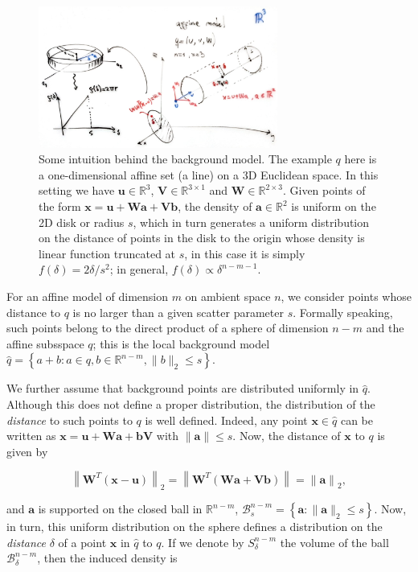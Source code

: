\documentclass[a4page,11pt]{article}
\renewcommand{\vec}[1]{\mathbf{#1}}%
\newcommand{\mat}[1]{\mathbf{#1}}%
\newcommand{\set}[1]{\mathcal{#1}}%
\newcommand{\setdef}[1]{\left\{#1\right\}}%
\newcommand{\norm}[1]{\left\|#1\right\|}%
\def\tra{^T}%
\def\reals{\mathbb{R}}%
\begin{document}
\begin{figure}
\centering\includegraphics[width=0.7\textwidth]{intuition}
\caption{\label{fig:intuition}Some intuition behind the background model. The example $q$ here is a one-dimensional affine set (a line) on a 3D Euclidean space. In this setting we have $\vec{u} \in \reals^{3}$, $\mat{V} \in \reals^{3{\times}1}$ and $\mat{W} \in \reals^{2{\times}3}$. Given points of the form $\vec{x}=\vec{u}+\vec{W}\vec{a}+\vec{V}\vec{b}$, the density of $\vec{a} \in \reals^2$ is uniform on the 2D disk or radius $s$, which in turn generates a uniform distribution on the distance of points in the disk to the origin whose  density is linear function truncated at $s$, in this case it is simply $f(\delta)=2\delta/s^2$; in general, $f(\delta) \propto \delta^{n-m-1}$.}
\end{figure}


For an affine model of dimension $m$ on ambient space $n$, we consider points whose distance to $q$ is no larger than a given scatter parameter $s$. Formally speaking, such points belong to  the direct product of a sphere of dimension $n-m$ and the affine subsspace $q$; this is the local background model $\hat{q} = \setdef{a+b: a \in q, b \in \reals^{n-m}, \|b\|_2 \leq s}$. 

We further assume that background points are distributed uniformly in $\hat{q}$. Although this does not define a proper distribution, the distribution of the \emph{distance} to such points to $q$ is well defined. Indeed, any point  $\vec{x} \in \hat{q}$ can be written as $\vec{x} = \vec{u} + \vec{W}\vec{a} + \vec{b}\vec{V}$ with $\|\vec{a}\| \leq s$. Now, the distance of $\vec{x}$ to $q$ is given by 

$$\norm{\mat{W}\tra(\vec{x}-\vec{u})}_2=\norm{\mat{W}\tra(\mat{W}\vec{a}+\mat{V}\vec{b})}=\norm{\vec{a}}_2,$$

and $\vec{a}$ is supported on the closed ball in $\reals^{n-m}$, $\set{B}^{n-m}_s=\setdef{\vec{a}: \|\vec{a}\|_2 \leq s}$. Now, in turn, this uniform distribution on the sphere defines a distribution on the \emph{distance} $\delta$ of a point $\vec{x}$ in $\hat{q}$ to $q$. If we denote by $S^{n-m}_\delta$ the volume of the ball $\set{B}^{n-m}_\delta$, then the induced density is
\end{document}
